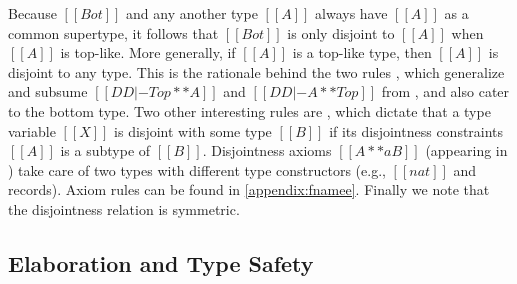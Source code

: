Because $[[Bot]]$ and any another type $[[A]]$ always have $[[A]]$ as
a common supertype,
it follows that $[[Bot]]$ is only disjoint to $[[A]]$ when
$[[A]]$ is top-like.
More generally, if $[[A]]$ is a top-like type, then $[[A]]$ is disjoint to any
type. This is the rationale behind the two rules , which
generalize and subsume $[[ DD |- Top ** A ]]$ and $[[ DD |- A ** Top ]]$ from \fname, and
also cater to the bottom type.
Two other interesting rules are
, which dictate that a type variable $[[X]]$ is disjoint
with some type $[[B]]$ if its disjointness constraints $[[A]]$ is a subtype of
$[[B]]$.
Disjointness axioms $[[ A **a B ]]$ (appearing in ) take
care of two types with different type constructors (e.g., $[[nat]]$ and records). Axiom rules can be found in \cref{appendix:fnamee}.
Finally we note that the disjointness relation is symmetric.



\subsection{Elaboration and Type Safety}
\label{sec:elaboration:fi}


